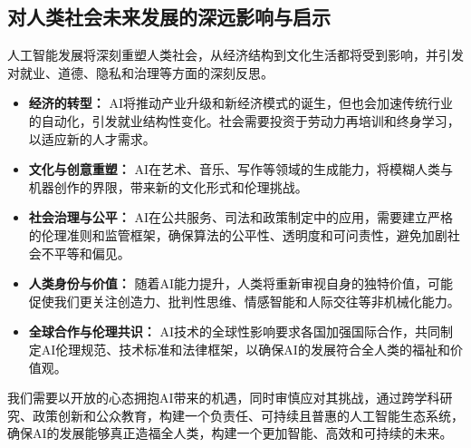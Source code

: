 \subsection{对人类社会未来发展的深远影响与启示}
人工智能发展将深刻重塑人类社会，从经济结构到文化生活都将受到影响，并引发对就业、道德、隐私和治理等方面的深刻反思。

\begin{itemize}
    \item \textbf{经济的转型：} AI将推动产业升级和新经济模式的诞生，但也会加速传统行业的自动化，引发就业结构性变化。社会需要投资于劳动力再培训和终身学习，以适应新的人才需求。
    \item \textbf{文化与创意重塑：} AI在艺术、音乐、写作等领域的生成能力，将模糊人类与机器创作的界限，带来新的文化形式和伦理挑战。
    \item \textbf{社会治理与公平：} AI在公共服务、司法和政策制定中的应用，需要建立严格的伦理准则和监管框架，确保算法的公平性、透明度和可问责性，避免加剧社会不平等和偏见。
    \item \textbf{人类身份与价值：} 随着AI能力提升，人类将重新审视自身的独特价值，可能促使我们更关注创造力、批判性思维、情感智能和人际交往等非机械化能力。
    \item \textbf{全球合作与伦理共识：} AI技术的全球性影响要求各国加强国际合作，共同制定AI伦理规范、技术标准和法律框架，以确保AI的发展符合全人类的福祉和价值观。
\end{itemize}

我们需要以开放的心态拥抱AI带来的机遇，同时审慎应对其挑战，通过跨学科研究、政策创新和公众教育，构建一个负责任、可持续且普惠的人工智能生态系统，确保AI的发展能够真正造福全人类，构建一个更加智能、高效和可持续的未来。
